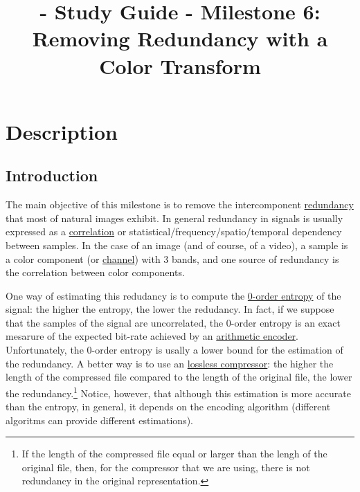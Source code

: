 
\title{\SM{} - Study Guide - Milestone 6: Removing Redundancy with a Color Transform}

\maketitle

\section{Description}

\subsection{Introduction}
The main objective of this milestone is to remove the intercomponent
\href{https://en.wikipedia.org/wiki/Data_redundancy}{redundancy} that
most of natural images exhibit. In general redundancy in signals is
usually expressed as a
\href{https://en.wikipedia.org/wiki/Correlation_and_dependence}{correlation}
or statistical/frequency/spatio/temporal dependency between
samples. In the case of an image (and of course, of a video), a sample
is a color component (or
\href{https://en.wikipedia.org/wiki/Color_image}{channel}) with 3
bands, and one source of redundancy is the correlation between color
components.

One way of estimating this redudancy is to compute the
\href{https://en.wikipedia.org/wiki/Entropy_(information_theory)}{0-order
  entropy} of the signal: the higher the entropy, the lower the
redudancy. In fact, if we suppose that the samples of the signal are
uncorrelated, the 0-order entropy is an exact mesarure of the expected
bit-rate achieved by an
\href{https://en.wikipedia.org/wiki/Arithmetic_coding}{arithmetic
  encoder}. Unfortunately, the 0-order entropy is usally a lower bound
for the estimation of the redundancy. A better way is to use an
\href{https://en.wikipedia.org/wiki/Data_compression}{lossless
  compressor}: the higher the length of the compressed file compared
to the length of the original file, the lower the
redundancy.\footnote{If the length of the compressed file equal or
  larger than the lengh of the original file, then, for the compressor
  that we are using, there is not redundancy in the original
  representation.} Notice, however, that although this estimation is
more accurate than the entropy, in general, it depends on the encoding
algorithm (different algoritms can provide different estimations).

